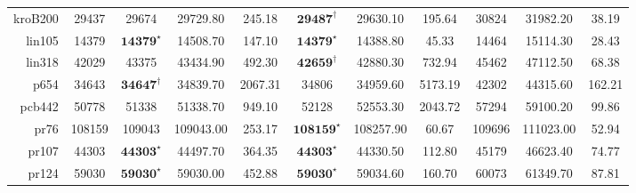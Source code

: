 \documentclass[12pt]{ctexart}
\begin{document}
\begin{table}[htbp]
\begin{tabular}{rcccccccccc}
        kroB200                       & 29437                             & 29674                       & 29729.80                               & 245.18           & $\textbf{29487}^\dag$   & 29630.10         & 195.64           & 30824                 & 31982.20         & 38.19            \\
        lin105                        & 14379                             & $\textbf{14379}^\star$      & 14508.70                               & 147.10           & $\textbf{14379}^\star$  & 14388.80         & 45.33            & 14464                 & 15114.30         & 28.43            \\
        lin318                        & 42029                             & 43375                       & 43434.90                               & 492.30           & $\textbf{42659}^\dag$   & 42880.30         & 732.94           & 45462                 & 47112.50         & 68.38            \\
        p654                          & 34643                             & $\textbf{34647}^\dag$       & 34839.70                               & 2067.31          & 34806                   & 34959.60         & 5173.19          & 42302                 & 44315.60         & 162.21           \\
        pcb442                        & 50778                             & 51338                       & 51338.70                               & 949.10           & 52128                   & 52553.30         & 2043.72          & 57294                 & 59100.20         & 99.86            \\
        pr76                          & 108159                            & 109043                      & 109043.00                              & 253.17           & $\textbf{108159}^\star$ & 108257.90        & 60.67            & 109696                & 111023.00        & 52.94            \\
        pr107                         & 44303                             & $\textbf{44303}^\star$      & 44497.70                               & 364.35           & $\textbf{44303}^\star$  & 44330.50         & 112.80           & 45179                 & 46623.40         & 74.77            \\
        pr124                         & 59030                             & $\textbf{59030}^\star$      & 59030.00                               & 452.88           & $\textbf{59030}^\star$  & 59034.60         & 160.70           & 60073                 & 61349.70         & 87.81            \\

\end{tabular}
\end{table}
\end{document}
